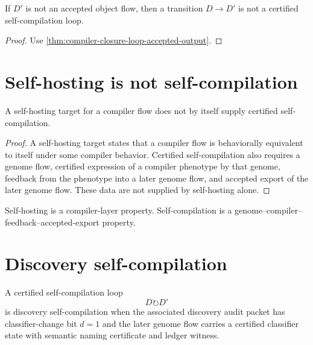 \begin{corollary}
\label{cor:compiler-closure-output-not-file-state}
If $D'$ is not an accepted object flow, then a transition $D\to D'$ is not a
certified self-compilation loop.
\end{corollary}
\begin{proof}
Use \autoref{thm:compiler-closure-loop-accepted-output}.
\end{proof}

\section{Self-hosting is not self-compilation}
\label{sec:compiler-closure-self-hosting-boundary}

\begin{theorem}
\label{thm:compiler-closure-self-hosting-weaker}
A self-hosting target for a compiler flow does not by itself supply certified
self-compilation.
\end{theorem}
\begin{proof}
A self-hosting target states that a compiler flow is behaviorally equivalent
to itself under some compiler behavior. Certified self-compilation also
requires a genome flow, certified expression of a compiler phenotype by that
genome, feedback from the phenotype into a later genome flow, and accepted
export of the later genome flow. These data are not supplied by self-hosting
alone.
\end{proof}

\begin{principle}
\label{prin:compiler-closure-self-hosting-boundary}
Self-hosting is a compiler-layer property. Self-compilation is a
genome--compiler--feedback--accepted-export property.
\end{principle}

\section{Discovery self-compilation}
\label{sec:compiler-closure-discovery-self-compilation}

\begin{definition}
\label{def:compiler-closure-discovery-self-compilation}
A certified self-compilation loop
$$
D\circlearrowright D'
$$
is discovery self-compilation when the associated discovery audit packet has
classifier-change bit $d=1$ and the later genome flow carries a certified
classifier state with semantic naming certificate and ledger witness.
\end{definition}

